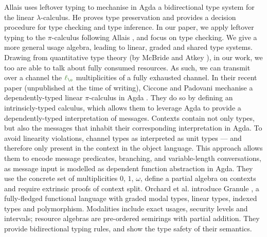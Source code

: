 \documentclass[a4paper,UKenglish,cleveref,autoref,thm-restate,authorcolumns]{lipics-v2019}
\theoremstyle{definition}
\newcommand{\lambdacalc}{$\lambda$-calculus}
\newcommand{\picalc}{$\pi$-calculus}
\newcommand{\func}[1]{\textcolor{OliveGreen}{\operatorname{#1}}}
\newcommand{\lz}{\func{\ell_{\o}}}
\begin{document}
Allais \cite{Allais2018a} uses leftover typing to mechanise in Agda a bidirectional type system for the linear \lambdacalc{}.
He proves type preservation and provides a decision procedure for type checking and type inference.
In our paper, we apply leftover typing to the \picalc{} following Allais \cite{Allais2018a}, and focus on type checking. We give a more general usage algebra, leading to linear, graded and shared type systems.
Drawing from quantitative type theory (by McBride and Atkey \cite{McBride2016, Atkey2018}), in our work, we too are able to talk about fully consumed resources.
As such, we can transmit over a channel the $\lz$ multiplicities of a fully exhausted channel.
%
In their recent paper (unpublished at the time of writing), Ciccone and Padovani mechanise a dependently-typed linear \picalc{} in Agda \cite{Ciccone}.
They do so by defining an intrinsicly-typed calculus, which allows them to leverage Agda to provide a dependently-typed interpretation of messages.
Contexts contain not only types, but also the messages that inhabit their corresponding interpretation in Agda.
To avoid linearity violations, channel types as interpreted as unit types --- and therefore only present in the context in the object language.
This approach allows them to encode message predicates, branching, and variable-length conversations, as message input is modelled as dependent function abstraction in Agda.
They use the concrete set of multiplicities $0$, $1$, $\omega$, define a partial algebra on contexts and require extrinsic proofs of context split.
%
Orchard et al. introduce Granule \cite{Orchard}, a fully-fledged functional language with graded modal types, linear types, indexed types and polymorphism.
Modalities include exact usages, security levels and intervals; resource algebras are pre-ordered semirings with partial addition.
They provide bidirectional typing rules, and show the type safety of their semantics.
\end{document}
